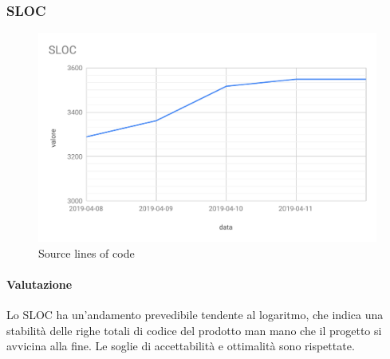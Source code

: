 \subsubsection{SLOC}
\begin{figure}[H]
	\centering
	\includegraphics[scale=0.6]{res/images/RA/sloc.pdf}
	\caption{Source lines of code}
\end{figure}
\paragraph*{Valutazione}
Lo SLOC ha un'andamento prevedibile tendente al logaritmo, che indica una stabilità delle righe totali di codice del prodotto man mano che il progetto si avvicina alla fine. Le soglie di accettabilità e ottimalità sono rispettate.


